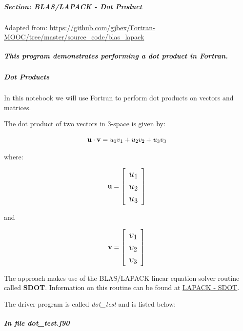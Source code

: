 \subparagraph{Section: BLAS/LAPACK - Dot Product}

Adapted from: \href{https://github.com/gjbex/Fortran-MOOC/tree/master/source\_code/blas\_lapack}{https://github.com/gjbex/Fortran-MOOC/tree/master/source\_code/blas\_lapack}

\subparagraph{This program demonstrates performing a dot product in Fortran.}

\subparagraph{Dot Products}

In this notebook we will use Fortran to perform dot products on vectors and matrices.

The dot product of two vectors in 3-space is given by:

\begin{equation}
\Large \mathbf{u} \cdot \mathbf{v} =
u_1 v_1 + u_2 v_2 + u_3 v_3
\end{equation}

where:

\begin{equation}
\Large \mathbf{u} =
\left[
\begin{array}{c}
u_{1}  \\
u_{2}  \\
u_{3}
\end{array}
\right]
\end{equation}

and

\begin{equation}
\Large \mathbf{v} =
\left[
\begin{array}{c}
v_{1}  \\
v_{2}  \\
v_{3}
\end{array}
\right]
\end{equation}

The approach makes use of the BLAS/LAPACK linear equation solver routine called \textbf{SDOT}.  Information on this routine can be found at \href{https://netlib.org/lapack/}{LAPACK - SDOT}.

The driver program is called \textit{dot\_test} and is listed below:

\subparagraph{In file dot\_test.f90}


